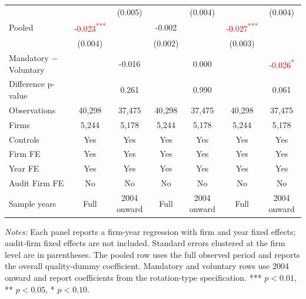 \documentclass[10pt]{article}
\newcommand{\sym}[1]{\textsuperscript{#1}}
\begin{document}
\begin{minipage}{19cm}
\begin{threeparttable}
\begin{tabular}{l cc cc cc}
 &  & (0.005) &  & (0.004) &  & (0.004) \\
Pooled & \textcolor{red}{-0.023\sym{***}} &  & -0.002 &  & \textcolor{red}{-0.027\sym{***}} &  \\
 & (0.004) &  & (0.002) &  & (0.003) &  \\
Mandatory $-$ Voluntary &  & -0.016 &  & 0.000 &  & \textcolor{red}{-0.026\sym{*}} \\
Difference p-value &  & 0.261 &  & 0.990 &  & 0.061 \\
Observations & 40,298 & 37,475 & 40,298 & 37,475 & 40,298 & 37,475 \\
Firms & 5,244 & 5,178 & 5,244 & 5,178 & 5,244 & 5,178 \\
\midrule
Controls & Yes & Yes & Yes & Yes & Yes & Yes \\
Firm FE & Yes & Yes & Yes & Yes & Yes & Yes \\
Year FE & Yes & Yes & Yes & Yes & Yes & Yes \\
Audit Firm FE & No & No & No & No & No & No \\
Sample years & Full & 2004 onward & Full & 2004 onward & Full & 2004 onward \\
\bottomrule
\end{tabular}
\begin{tablenotes}\fontsize{9}{11}\selectfont
\item \fontsize{9}{11}\selectfont \textit{Notes:} Each panel reports a firm-year regression with firm and year fixed effects; audit-firm fixed effects are not included. Standard errors clustered at the firm level are in parentheses. The pooled row uses the full observed period and reports the overall quality-dummy coefficient. Mandatory and voluntary rows use 2004 onward and report coefficients from the rotation-type specification. *** \(p<0.01\), ** \(p<0.05\), * \(p<0.10\).
\end{tablenotes}
\end{threeparttable}

\end{minipage}
\end{document}
